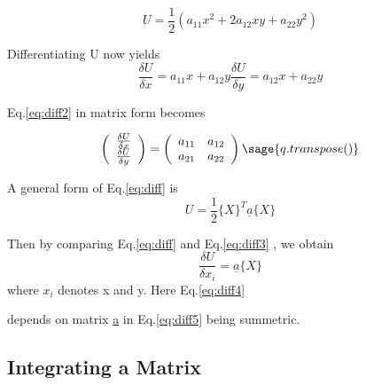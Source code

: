 \documentclass[12pt]{report}
\newcommand{\lab}[1]{
	Eq.\ref{#1}
}
\begin{document}
\begin{equation} 
	U = \frac{1}{2}(a_{{11}}x^2 +2a_{{12}}xy + a_{{22}}y^2)
\end{equation}

Differentiating U now yields 
\begin{equation} 
	\frac{\delta U}{\delta x} = a_{{11}}x + a_{{12}}y  \frac{\delta U}{\delta y} = a_{{12}}x + a_{{22}}y 
	\label{eq:diff2}
	\end{equation} 
	\lab{eq:diff2} in matrix form becomes

\begin{equation}
	\left(\begin{array}{rr} \frac{\delta U}{\delta x} \\
	\frac{\delta U}{\delta y} \\ 
	\end{array}\right) = \left(\begin{array}{rr}a_{11} & a_{12} \\
	a_{21} & a_{22}\\ 
	\end{array}\right) \sage{q.transpose()}\label{eq:diff3}
\end{equation}

A general form of \lab{eq:diff} is 
\begin{equation} 
	U = \frac{1}{2}\{X\}^T\underline{a}\{X\}
	\label{eq:diff5}
\end{equation}

Then by comparing \lab{eq:diff} and \lab{eq:diff3}, we obtain 
\begin{equation}
	\frac{ \delta U}{\delta x_{i}} = \underline{a}\{X\}
	\label{eq:diff4}
\end{equation}
where $x_{i}$ denotes x and y. Here \lab{eq:diff4} 
depends on matrix \underline{a} in \lab{eq:diff5}being summetric.


\subsection{Integrating a Matrix}
\end{document}
